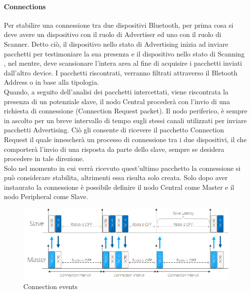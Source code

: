 \paragraph{Connections}
Per stabilire una connessione tra due dispositivi Bluetooth, per prima cosa si deve avere un dispositivo con il ruolo di Advertiser ed uno con il ruolo di Scanner. Detto ciò, il dispositivo nello stato di Advertising inizia ad inviare pacchetti per testimoniare la sua presenza e il dispositivo nello stato di Scanning , nel mentre, deve scansionare l'intera area al fine di acquisire i pacchetti inviati dall'altro device. I pacchetti riscontrati, verranno filtrati attraverso il Bletooth Address o in base alla tipologia. \\
Quando, a seguito dell'analisi dei pacchetti intercettati, viene riscontrata la presenza di un potenziale slave, il nodo Central procederà con l'invio di una richiesta di connessione (Connection Request packet). Il nodo periferico, è sempre in ascolto per un breve intervallo di tempo sugli stessi canali utilizzati per inviare pacchetti Advertising. Ciò gli consente di ricevere il pacchetto Connection Request il quale innescherà un processo di connessione tra i due dispositivi, il che comporterà l'invio di una risposta da parte dello slave, sempre se desidera procedere in tale direzione.\\
Solo nel momento in cui verrà ricevuto quest'ultimo pacchetto la connessione si può considerare stabilita, altrimenti essa risulta solo creata. Solo dopo aver instaurato la connessione è possibile definire il nodo Central come Master e il nodo Peripheral come Slave.\\

\begin{figure}[!ht]
    \centering
    \includegraphics[width = \textwidth]{images/Connection events.png}
    \caption{Connection events}
    \label{fig:connection_events}
\end{figure}

